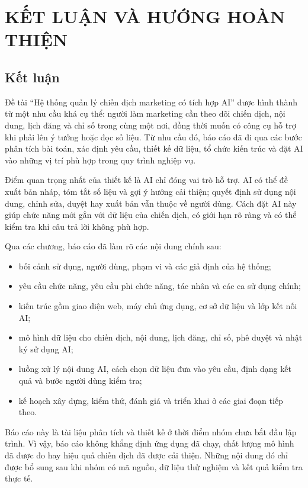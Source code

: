\chapter{KẾT LUẬN VÀ HƯỚNG HOÀN THIỆN}

\section{Kết luận}

Đề tài ``Hệ thống quản lý chiến dịch marketing có tích hợp AI'' được hình thành từ một nhu cầu khá cụ thể: người làm marketing cần theo dõi chiến dịch, nội dung, lịch đăng và chỉ số trong cùng một nơi, đồng thời muốn có công cụ hỗ trợ khi phải lên ý tưởng hoặc đọc số liệu. Từ nhu cầu đó, báo cáo đã đi qua các bước phân tích bài toán, xác định yêu cầu, thiết kế dữ liệu, tổ chức kiến trúc và đặt AI vào những vị trí phù hợp trong quy trình nghiệp vụ.

Điểm quan trọng nhất của thiết kế là AI chỉ đóng vai trò hỗ trợ. AI có thể đề xuất bản nháp, tóm tắt số liệu và gợi ý hướng cải thiện; quyết định sử dụng nội dung, chỉnh sửa, duyệt hay xuất bản vẫn thuộc về người dùng. Cách đặt AI này giúp chức năng mới gắn với dữ liệu của chiến dịch, có giới hạn rõ ràng và có thể kiểm tra khi câu trả lời không phù hợp.

Qua các chương, báo cáo đã làm rõ các nội dung chính sau:

\begin{itemize}
\item bối cảnh sử dụng, người dùng, phạm vi và các giả định của hệ thống;
\item yêu cầu chức năng, yêu cầu phi chức năng, tác nhân và các ca sử dụng chính;
\item kiến trúc gồm giao diện web, máy chủ ứng dụng, cơ sở dữ liệu và lớp kết nối AI;
\item mô hình dữ liệu cho chiến dịch, nội dung, lịch đăng, chỉ số, phê duyệt và nhật ký sử dụng AI;
\item luồng xử lý nội dung AI, cách chọn dữ liệu đưa vào yêu cầu, định dạng kết quả và bước người dùng kiểm tra;
\item kế hoạch xây dựng, kiểm thử, đánh giá và triển khai ở các giai đoạn tiếp theo.
\end{itemize}

Báo cáo này là tài liệu phân tích và thiết kế ở thời điểm nhóm chưa bắt đầu lập trình. Vì vậy, báo cáo không khẳng định ứng dụng đã chạy, chất lượng mô hình đã được đo hay hiệu quả chiến dịch đã được cải thiện. Những nội dung đó chỉ được bổ sung sau khi nhóm có mã nguồn, dữ liệu thử nghiệm và kết quả kiểm tra thực tế.

